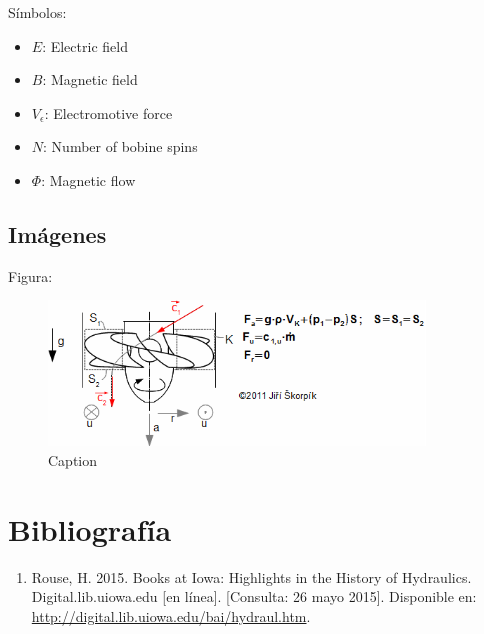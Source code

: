 \documentclass[12pt, letterpaper]{article}
\begin{document}
Símbolos:

\begin{itemize}
\item $E$: Electric field
\item $B$: Magnetic field
\item $V_\epsilon$: Electromotive force
\item $N$: Number of bobine spins
\item $\Phi$: Magnetic flow
\end{itemize}


\subsection{Imágenes}

Figura:

\begin{figure}[H]
    \centering
    \includegraphics[width=10cm]{media/turbine_force.png}
    \caption{Caption}
\end{figure}



\newpage

\section*{Bibliografía}

\sloppy  %

\begin{enumerate}

\item Rouse, H. 2015. Books at Iowa: Highlights in the History of Hydraulics. Digital.lib.uiowa.edu [en línea]. [Consulta: 26 mayo 2015]. Disponible en: \url{http://digital.lib.uiowa.edu/bai/hydraul.htm}.

\end{enumerate}
\end{document}
